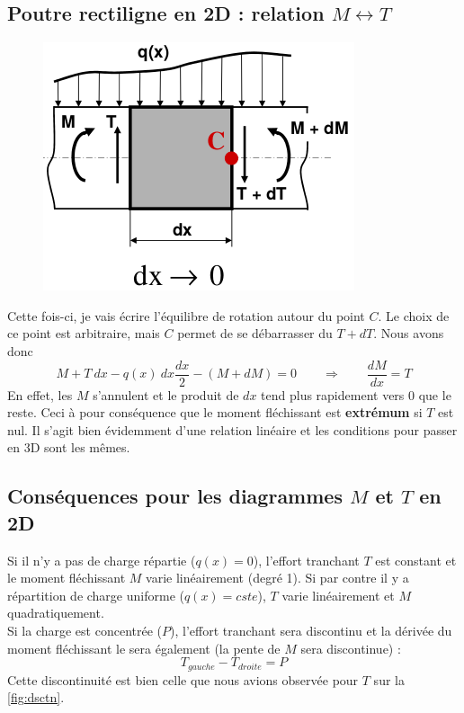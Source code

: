 	\subsection{Poutre rectiligne en 2D : relation $M \leftrightarrow T$}
	\begin{figure}
	\vspace{-5mm}
	\includegraphics[scale=0.35]{ch2/image12.png}
	\end{figure}
	Cette fois-ci, je vais écrire l'équilibre de rotation autour du 
	point $C$. Le choix de ce point est arbitraire, mais $C$ permet de 
	se débarrasser du $T+dT$. Nous avons donc
	\begin{equation}
	M + T\ dx - q(x)\ dx \frac{dx}{2} - (M+dM)=0\qquad\Longrightarrow\qquad
	\dfrac{dM}{dx}= T
	\end{equation}
	En effet, les $M$ s'annulent et le produit de $dx$ tend plus rapidement 
	vers 0 que le reste. Ceci à pour conséquence que le moment fléchissant 
	est \textbf{extrémum} si $T$ est nul. Il s'agit bien évidemment d'une 
	relation linéaire et les conditions pour passer en 3D sont les mêmes.
	
	
	\subsection{Conséquences pour les diagrammes $M$ et $T$ en 2D}
	Si il n'y a pas de charge répartie ($q(x)=0$), l'effort tranchant $T$ est 
	constant et le moment fléchissant $M$ varie linéairement (degré 1). Si 
	par contre il y a répartition de charge uniforme ($q(x)=cste$), $T$ varie 
	linéairement et $M$ quadratiquement.\\
	
	Si la charge est concentrée ($P$), l'effort tranchant sera discontinu et la 
	dérivée du moment fléchissant le sera également (la pente de $M$ sera 
	discontinue) :
	\begin{equation}
	T_{gauche} - T_{droite} = P
	\end{equation}
	Cette discontinuité est bien celle que nous avions observée pour $T$ sur 
	la \autoref{fig:dsctn}.\\
	
